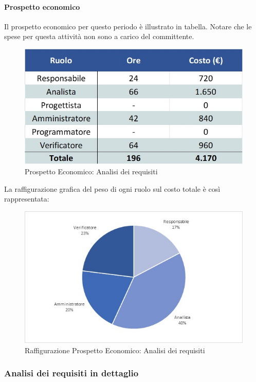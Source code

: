 \paragraph{Prospetto economico}
Il prospetto economico per questo periodo è illustrato in tabella. Notare che le spese per questa attività non sono a carico del committente.
\begin{figure}[H]
	\centerline{\includegraphics[scale=0.7]{img/Preventivo/AnalisiRequisitiEconomico.jpg}}
	\caption{Prospetto Economico: Analisi dei requisiti}
	\clearpage
\end{figure}
La raffigurazione grafica del peso di ogni ruolo sul costo totale è così rappresentata: 
\begin{figure}[H]
	\centerline{\includegraphics[scale=0.9]{img/Preventivo/Torte/AnalisiRequisiti.jpg}}
	\caption{Raffigurazione Prospetto Economico: Analisi dei requisiti}
	\clearpage
\end{figure}
\newpage
\subsubsection{Analisi dei requisiti in dettaglio}
